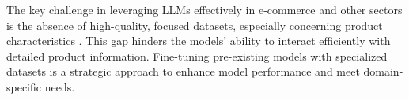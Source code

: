 The key challenge in leveraging LLMs effectively in e-commerce and other sectors is the absence of high-quality, focused datasets, especially concerning product characteristics \cite{macková2023promap}. This gap hinders the models' ability to interact efficiently with detailed product information. Fine-tuning pre-existing models with specialized datasets is a strategic approach to enhance model performance and meet domain-specific needs.